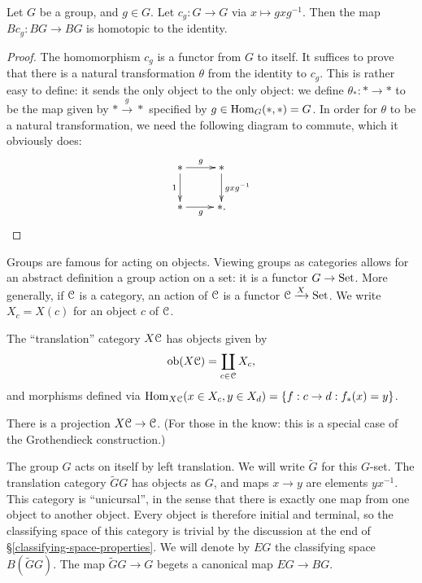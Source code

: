 \begin{lemma}
    Let $G$ be a group, and $g\in G$.  Let $c_g:G\to G$ via $x\mapsto
    gxg^{-1}$.  Then the map $Bc_g:BG\to BG$ is homotopic to the identity.
\end{lemma}
\begin{proof}
    The homomorphism $c_g$ is a functor from $G$ to itself. It suffices to
    prove that there is a natural transformation $\theta$ from the identity to
    $c_g$. This is rather easy to define: it sends the only object to the only
    object: we define $\theta_\ast:\ast\to \ast$ to be the map given by
    $\ast\xrightarrow{g}\ast$ specified by $g\in \operatorname{Hom}_G(\ast,\ast) = G$. In
    order for $\theta$ to be a natural transformation, we need the following
    diagram to commute, which it obviously does:
    \begin{equation*}
	\xymatrix{
	    \ast\ar[d]_1\ar[r]^g & \ast\ar[d]^{gxg^{-1}}\\
	    \ast\ar[r]_{g} & \ast.
	    }
    \end{equation*}
\end{proof}
Groups are famous for acting on objects. Viewing groups as categories allows
for an abstract definition a group action on a set: it is a functor $G\to
\mathrm{Set}$. More generally, if $\mathcal C$ is a category, an action of $\mathcal C$ is a functor
$\mathcal C\xrightarrow{X}\mathrm{Set}$. We write $X_c = X(c)$ for an object $c$ of $\mathcal C$.
\begin{definition}
    The ``translation'' category $X\mathcal C$ has objects given by
    $$\mathrm{ob}(X\mathcal C) = \coprod_{c\in \mathcal C}X_c,$$
    and morphisms defined via $\operatorname{Hom}_{X\mathcal C}(x\in X_c, y\in X_d) = \{f:c\to
    d:f_\ast(x) = y\}$.
\end{definition}
There is a projection $X\mathcal C\to \mathcal C$. (For those in the know: this is a special
case of the Grothendieck construction.)
\begin{example}
    The group $G$ acts on itself by left translation. We will write
    $\widetilde{G}$ for this $G$-set. The translation category $\widetilde{G}G$
    has objects as $G$, and maps $x\to y$ are elements $yx^{-1}$. This category
    is ``unicursal'', in the sense that there is exactly one map from one
    object to another object. Every object is therefore initial and terminal,
    so the classifying space of this category is trivial by the discussion at
    the end of \S \ref{classifying-space-properties}. We will denote by $EG$
    the classifying space $B(\widetilde{G}G)$. The map $\widetilde{G}G\to G$
    begets a canonical map $EG\to BG$.
\end{example}
